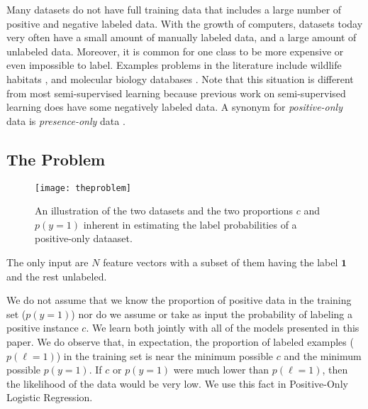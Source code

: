 \documentclass{article}
\begin{document}
Many datasets do not have full training data that includes a large number of positive and negative labeled data.  With the growth of computers, datasets today very often have a small amount of manually labeled data, and a large amount of unlabeled data. Moreover, it is common for one class to be more expensive or even impossible to label.  Examples problems in the literature include wildlife habitats \cite{ward08}, and molecular biology databases \cite{elkan08}.  Note that this situation is different from most semi-supervised learning because previous work on semi-supervised learning does have some negatively labeled data.  A synonym for \emph{positive-only} data is \emph{presence-only} data \cite{ward08}.

\subsection{The Problem}

\begin{figure}[ht!]
\vskip 0.2in
\begin{center}
\centerline{\texttt{[image: theproblem]}}
\caption{An illustration of the two datasets and the two proportions $c$ and $p(y=1)$ inherent in estimating the label probabilities of a positive-only dataaset. }
\label{changingodds}
\end{center}
\vskip -0.2in
\end{figure}

The only input are $N$ feature vectors with a subset of them having the label $\mathbf{1}$ and the rest unlabeled.  

We do not assume that we know the proportion of positive data in the training set ($p(y=1)$) nor do we assume or take as input the probability of labeling a positive instance $c$.  We learn both jointly with all of the models presented in this paper.  We do observe that, in expectation, the proportion of labeled examples ($p(\ell=1)$) in the training set is near the minimum possible $c$ and the minimum possible $p(y=1)$. If $c$ or $p(y=1)$ were much lower than $p(\ell=1)$, then the likelihood of the data would be very low.  We use this fact in Positive-Only Logistic Regression.
\end{document}
